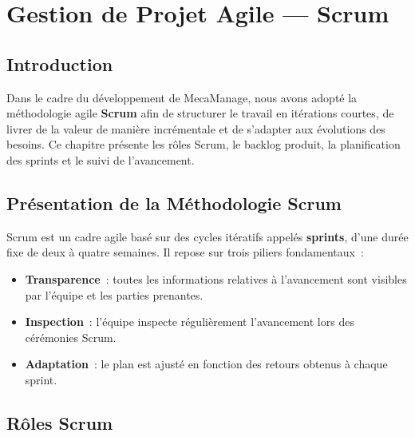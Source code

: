 \documentclass[12pt,a4paper]{report}
\begin{document}
\chapter{Gestion de Projet Agile --- Scrum}

\section*{Introduction}
Dans le cadre du d\'{e}veloppement de MecaManage, nous avons adopt\'{e}
la m\'{e}thodologie agile \textbf{Scrum} afin de structurer le travail
en it\'{e}rations courtes, de livrer de la valeur de mani\`{e}re
incr\'{e}mentale et de s'adapter aux \'{e}volutions des besoins.
Ce chapitre pr\'{e}sente les r\^{o}les Scrum, le backlog produit,
la planification des sprints et le suivi de l'avancement.

\section{Pr\'{e}sentation de la M\'{e}thodologie Scrum}

Scrum est un cadre agile bas\'{e} sur des cycles it\'{e}ratifs appel\'{e}s
\textbf{sprints}, d'une dur\'{e}e fixe de deux \`{a} quatre semaines.
Il repose sur trois piliers fondamentaux~:

\begin{itemize}[leftmargin=1.5cm]
  \item \textbf{Transparence}~: toutes les informations relatives
    \`{a} l'avancement sont visibles par l'\'{e}quipe et les parties
    prenantes.
  \item \textbf{Inspection}~: l'\'{e}quipe inspecte r\'{e}guli\`{e}rement
    l'avancement lors des c\'{e}r\'{e}monies Scrum.
  \item \textbf{Adaptation}~: le plan est ajust\'{e} en fonction des
    retours obtenus \`{a} chaque sprint.
\end{itemize}

\section{R\^{o}les Scrum}
\end{document}
